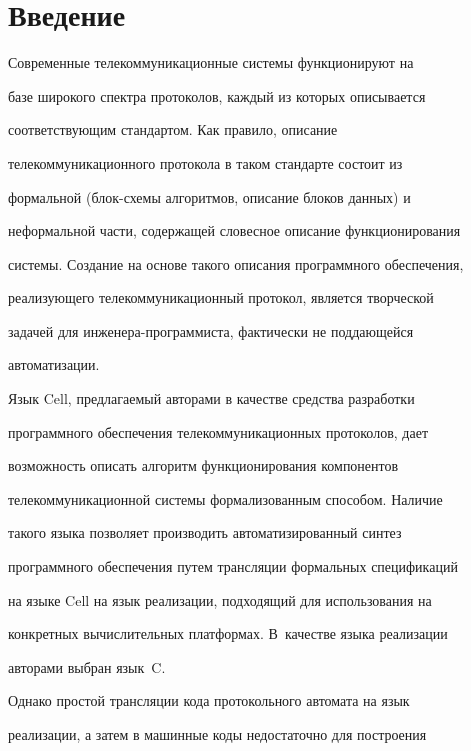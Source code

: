 \section{Введение}


      


      Современные телекоммуникационные сис\-те\-мы функционируют на 


базе широкого спектра протоколов, каждый из которых описывается 


соответствующим стандартом. Как правило, описание 


телекоммуникационного протокола в таком стандарте состоит из 


формальной (блок-схе\-мы алгоритмов, описание блоков данных) и 


неформальной час\-ти, содержащей словесное описание функционирования 


сис\-те\-мы. Создание на основе такого описания программного обеспечения, 


реализующего телекоммуникационный протокол, является творческой 


задачей для ин\-же\-не\-ра-про\-грам\-миста, фактически не поддающейся 


автоматизации. 


      


      Язык Cell, предлагаемый авторами в качестве средства разработки 


про\-грам\-мно\-го обеспечения телекоммуникационных протоколов, дает 


возможность описать алгоритм функционирования компонентов 


телекоммуникационной сис\-те\-мы формализованным способом.  Наличие 


такого языка позволяет производить автоматизированный синтез 


программного обеспечения путем трансляции формальных спецификаций 


на языке Cell на язык реализации, подходящий для использования на 


конкретных вычислительных платформах. В~качестве языка реализации 


авторами выбран язык~C. 


      


      Однако простой трансляции кода протокольного автомата на язык 


реализации, а затем в машинные коды недостаточно для построения 


